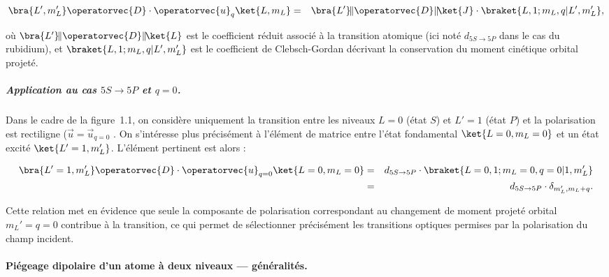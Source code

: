 \begin{eqnarray}
	\bra{L', m_{L}'} \operatorvec{D} \cdot \operatorvec{u}_q \ket{L, m_L} 
	& = & \bra{L'}\!\|\operatorvec{D}\|\!\ket{J} \cdot \braket{L, 1; m_L, q | L', m_{L}'} ,
	\label{eq:WignerEckart}
\end{eqnarray}

où $\bra{L'}\!\|\operatorvec{D}\|\!\ket{L}$ est le coefficient réduit associé à la transition atomique (ici noté $d_{\scriptstyle 5S \rightarrow 5P}$ dans le cas du rubidium), et $\braket{L, 1; m_L, q | L', m_{L}'}$ est le coefficient de Clebsch-Gordan décrivant la conservation du moment cinétique orbital projeté.

\subparagraph{Application au cas $5S \rightarrow 5P$ et $q = 0$. }

Dans le cadre de la figure~1.1, on considère uniquement la transition entre les niveaux $L = 0$ (état $S$) et $L' = 1$ (état $P$) et la polarisation est rectiligne ($\vec{u} = \vec{u}_{q = 0}$  . On s’intéresse plus précisément à l’élément de matrice entre l’état fondamental $\ket{L=0, m_L = 0}$ et un état excité $\ket{L'=1, m_{L}'}$. L’élément pertinent est alors :

\begin{eqnarray}
	\bra{L' = 1, m_L'} \operatorvec{D} \cdot \operatorvec{u}_{q=0} \ket{L = 0, m_L = 0} 
	& = & d_{\scriptstyle 5S \rightarrow 5P} \cdot \braket{L=0, 1; m_L = 0, q=0 | 1, m_L' } \\
	& = & d_{\scriptstyle 5S \rightarrow 5P} \cdot \delta_{m_L', m_L + q}.
	\label{eq:ClebschSimple}
\end{eqnarray}

 Cette relation met en évidence que seule la composante de polarisation correspondant au changement de moment projeté orbital $m_L' = q = 0$ contribue à la transition, ce qui permet de sélectionner précisément les transitions optiques permises par la polarisation du champ incident.

\paragraph{Piégeage dipolaire d’un atome à deux niveaux — généralités.}

